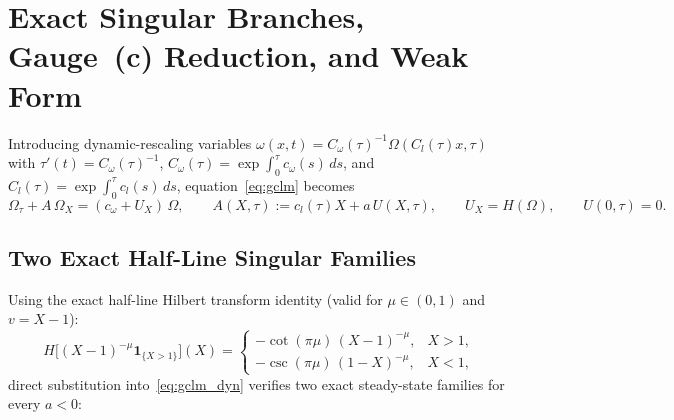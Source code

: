\documentclass[11pt,a4paper]{article}
\begin{document}
\section{Exact Singular Branches, Gauge~(c) Reduction, and Weak Form}\label{sec:setup}

Introducing dynamic-rescaling variables $\omega(x,t) = C_\omega(\tau)^{-1}\Omega(C_l(\tau)x, \tau)$ with $\tau'(t) = C_\omega(\tau)^{-1}$, $C_\omega(\tau) = \exp\int_0^\tau c_\omega(s)\,ds$, and $C_l(\tau) = \exp\int_0^\tau c_l(s)\,ds$, equation~\eqref{eq:gclm} becomes
\begin{equation}\label{eq:gclm_dyn}
\Omega_\tau + A\,\Omega_X = (c_\omega + U_X)\,\Omega, \qquad A(X,\tau) := c_l(\tau) X + a\,U(X,\tau), \qquad U_X = H(\Omega), \qquad U(0,\tau) = 0.
\end{equation}

\subsection{Two Exact Half-Line Singular Families}
Using the exact half-line Hilbert transform identity (valid for $\mu \in (0,1)$ and $v = X-1$):
\begin{equation}\label{eq:halfline_H}
H\big[(X-1)^{-\mu}\mathbf{1}_{\{X>1\}}\big](X) =
\begin{cases}
-\cot(\pi\mu)\,(X-1)^{-\mu}, & X > 1, \\
-\csc(\pi\mu)\,(1-X)^{-\mu}, & X < 1,
\end{cases}
\end{equation}
direct substitution into~\eqref{eq:gclm_dyn} verifies two exact steady-state families for every $a < 0$:
\end{document}
